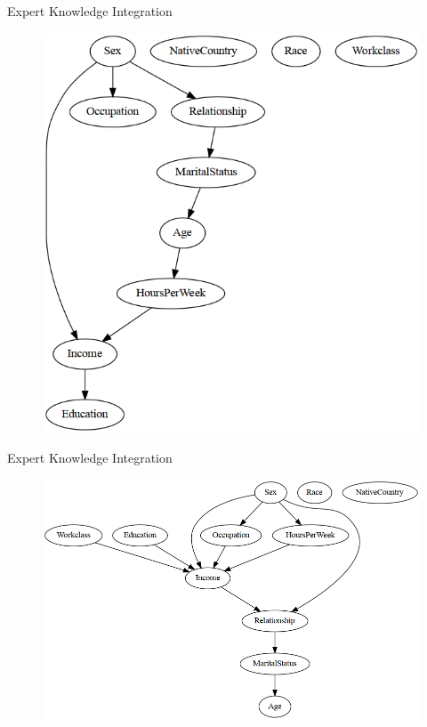 \documentclass{beamer}
\begin{document}
\begin{frame}{Expert Knowledge Integration} 
	\begin{figure}
		\centering
		\includegraphics[scale=0.4]{imgs/adult_bic_start.png}
	\end{figure}
\end{frame}

\begin{frame}{Expert Knowledge Integration}
	\begin{figure}
		\centering
		\includegraphics[scale=0.4]{imgs/adult_bic_fixed.png}
	\end{figure}
\end{frame}
\end{document}
